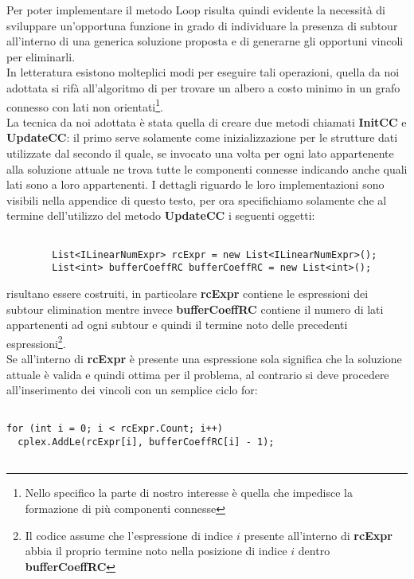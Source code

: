 \documentclass[11pt]{article}
\begin{document}
Per poter implementare il metodo Loop risulta quindi evidente la necessità di sviluppare un'opportuna funzione in grado di individuare la presenza di subtour all'interno di una generica soluzione proposta e di generarne gli opportuni vincoli per eliminarli.\\
In letteratura esistono molteplici modi per eseguire tali operazioni, quella da noi adottata si rifà all'algoritmo di  per trovare un albero a costo minimo in un grafo connesso con lati non orientati\footnote{Nello specifico la parte di nostro interesse è quella che impedisce la formazione di più componenti connesse}.\\
La tecnica da noi adottata è stata quella di creare due metodi chiamati \textbf{InitCC} e \textbf{UpdateCC}: il primo serve solamente come inizializzazione per le strutture dati utilizzate dal secondo il quale, se invocato una volta per ogni lato appartenente alla soluzione attuale ne trova tutte le componenti connesse indicando anche quali lati sono a loro appartenenti. I dettagli riguardo le loro implementazioni sono visibili nella appendice di questo testo, per ora specifichiamo solamente che al termine dell'utilizzo del metodo \textbf{UpdateCC} i seguenti oggetti:

\begin{lstlisting}

        List<ILinearNumExpr> rcExpr = new List<ILinearNumExpr>();
        List<int> bufferCoeffRC bufferCoeffRC = new List<int>();

\end{lstlisting}

risultano essere costruiti, in particolare \textbf{rcExpr} contiene le espressioni dei subtour elimination mentre invece \textbf{bufferCoeffRC} contiene il numero di lati appartenenti ad ogni subtour e quindi il termine noto delle precedenti espressioni\footnote{Il codice assume che l'espressione di indice $i$ presente all'interno di \textbf{rcExpr} abbia il proprio termine noto nella posizione di indice $i$ dentro \textbf{bufferCoeffRC}}.\\
Se all'interno di \textbf{rcExpr} è presente una espressione sola significa che la soluzione attuale è valida e quindi ottima per il problema, al contrario si deve procedere all'inserimento dei vincoli con un semplice ciclo for:

\begin{lstlisting}
                
for (int i = 0; i < rcExpr.Count; i++)
  cplex.AddLe(rcExpr[i], bufferCoeffRC[i] - 1);
              
\end{lstlisting}
\end{document}
